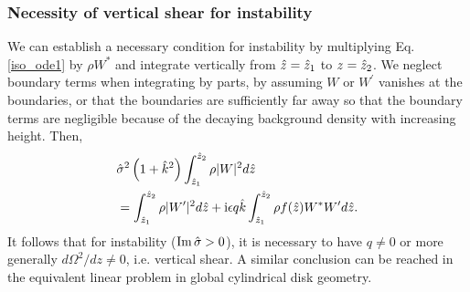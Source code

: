 

\subsubsection{Necessity of vertical shear for
  instability}\label{integral_relation} 
We can establish a necessary condition for instability by multiplying
Eq. \ref{iso_ode1} by $\rho W^*$ and integrate vertically from
$\hat{z}=\hat{z}_1$ to $z=\hat{z}_2$. We neglect boundary 
terms when integrating by parts, by assuming $W$ or
$W^\prime$ vanishes at the boundaries, or that the boundaries are 
sufficiently far away so that the boundary terms are negligible because of the
decaying background density with increasing height. Then,
\begin{align}
  &\hat{\sigma}^2\left(1+\hat{k}^2\right)\int_{\hat{z}_1}^{\hat{z}_2}\rho|W|^2d\hat{z} \notag\\
  &=\int_{\hat{z}_1}^{\hat{z}_2}\rho|W^\prime|^2d\hat{z} 
  +\mathrm{i} \epsilon q \hat{k}\int_{\hat{z}_1}^{\hat{z}_2}\rho f(\hat{z}) W^*W^\prime d\hat{z}.\label{integral_relation1}
\end{align}
It follows that for instability ($\operatorname{Im}\hat{\sigma}>0$), it is necessary to
have $q\neq0$ or more generally $d\Omega^2/dz\neq 0$, i.e. vertical
shear. A similar conclusion can be reached in the equivalent linear  
problem in global cylindrical disk geometry. 

